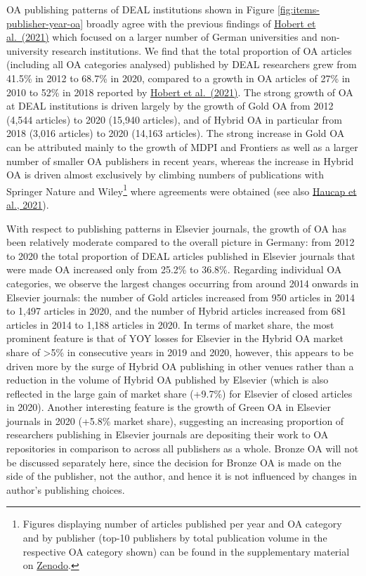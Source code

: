 \documentclass[
]{article}
\begin{document}
OA publishing patterns of DEAL institutions shown in Figure \ref{fig:items-publisher-year-oa} broadly agree with the previous findings of \href{https://doi.org/10.1007/s11192-021-04002-0}{Hobert et al.~(2021)} which focused on a larger number of German universities and non-university research institutions. We find that the total proportion of OA articles (including all OA categories analysed) published by DEAL researchers grew from 41.5\% in 2012 to 68.7\% in 2020, compared to a growth in OA articles of 27\% in 2010 to 52\% in 2018 reported by \href{https://doi.org/10.1007/s11192-021-04002-0}{Hobert et al.~(2021)}. The strong growth of OA at DEAL institutions is driven largely by the growth of Gold OA from 2012 (4,544 articles) to 2020 (15,940 articles), and of Hybrid OA in particular from 2018 (3,016 articles) to 2020 (14,163 articles). The strong increase in Gold OA can be attributed mainly to the growth of MDPI and Frontiers as well as a larger number of smaller OA publishers in recent years, whereas the increase in Hybrid OA is driven almost exclusively by climbing numbers of publications with Springer Nature and Wiley\footnote{Figures displaying number of articles published per year and OA category and by publisher (top-10 publishers by total publication volume in the respective OA category shown) can be found in the supplementary material on \href{https://doi.org/10.5281/zenodo.4771575}{Zenodo}.} where agreements were obtained (see also \href{https://doi.org/10.1002/mde.3493}{Haucap et al., 2021}).

With respect to publishing patterns in Elsevier journals, the growth of OA has been relatively moderate compared to the overall picture in Germany: from 2012 to 2020 the total proportion of DEAL articles published in Elsevier journals that were made OA increased only from 25.2\% to 36.8\%. Regarding individual OA categories, we observe the largest changes occurring from around 2014 onwards in Elsevier journals: the number of Gold articles increased from 950 articles in 2014 to 1,497 articles in 2020, and the number of Hybrid articles increased from 681 articles in 2014 to 1,188 articles in 2020. In terms of market share, the most prominent feature is that of YOY losses for Elsevier in the Hybrid OA market share of \textgreater5\% in consecutive years in 2019 and 2020, however, this appears to be driven more by the surge of Hybrid OA publishing in other venues rather than a reduction in the volume of Hybrid OA published by Elsevier (which is also reflected in the large gain of market share (+9.7\%) for Elsevier of closed articles in 2020). Another interesting feature is the growth of Green OA in Elsevier journals in 2020 (+5.8\% market share), suggesting an increasing proportion of researchers publishing in Elsevier journals are depositing their work to OA repositories in comparison to across all publishers as a whole. Bronze OA will not be discussed separately here, since the decision for Bronze OA is made on the side of the publisher, not the author, and hence it is not influenced by changes in author's publishing choices.
\end{document}
